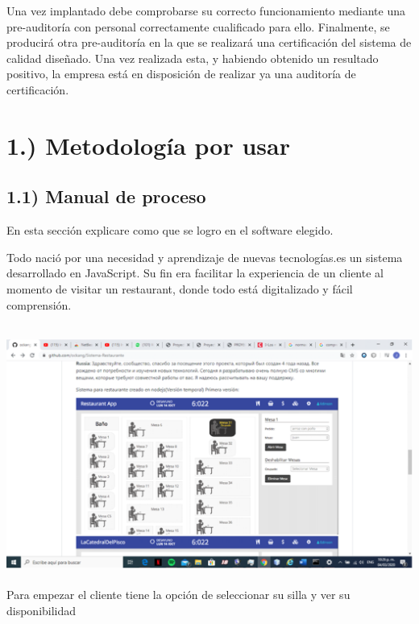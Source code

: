 \documentclass{article} %
\begin{document}
\noindent Una vez implantado debe comprobarse su correcto funcionamiento mediante una pre-auditor\'{i}a con personal correctamente cualificado para ello. Finalmente, se producir\'{a} otra pre-auditor\'{i}a en la que se realizar\'{a} una certificaci\'{o}n del sistema de calidad dise\~{n}ado. Una vez realizada esta, y habiendo obtenido un resultado positivo, la empresa est\'{a} en disposici\'{o}n de realizar ya una auditor\'{i}a de certificaci\'{o}n.


\section{1.) Metodolog\'{i}a por usar}


\subsection{        1.1) Manual de proceso}

\noindent En esta secci\'{o}n explicare como que se logro en el software elegido.

\noindent Todo naci\'{o} por una necesidad y aprendizaje de nuevas tecnolog\'{i}as.es un sistema desarrollado en JavaScript. Su fin era facilitar la experiencia   de un cliente al momento de visitar un restaurant, donde todo est\'{a} digitalizado y f\'{a}cil comprensi\'{o}n.

\noindent \includegraphics*[width=5.46in, height=3.35in, keepaspectratio=false, trim=2.02in 0.78in 4.34in 1.38in]{image2}Para empezar el cliente tiene la opci\'{o}n de seleccionar su silla y ver su disponibilidad 

\noindent 

\noindent 

\noindent 
\end{document}
